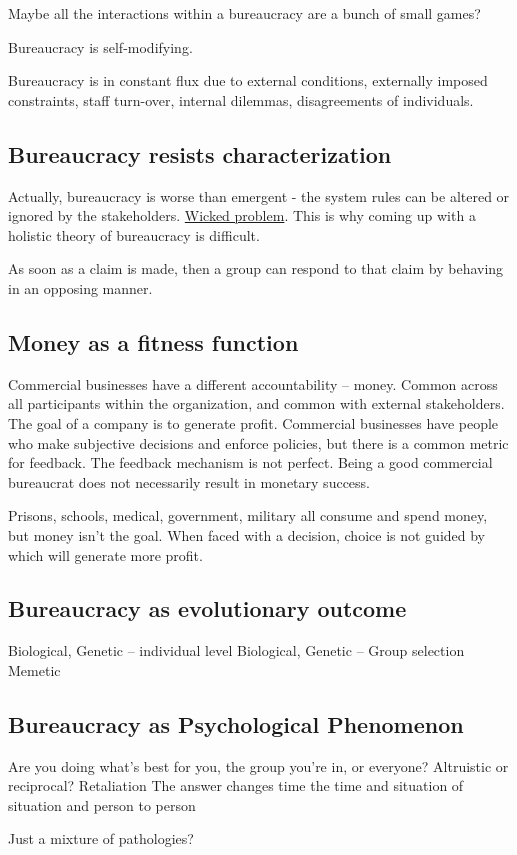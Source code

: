Maybe all the interactions within a bureaucracy are a bunch of small games?

Bureaucracy is self-modifying. 

Bureaucracy is in constant flux due to external conditions, externally imposed constraints, staff turn-over, internal dilemmas, disagreements of individuals. 


\subsection{Bureaucracy resists characterization}
Actually, bureaucracy is worse than emergent - the system rules can be altered or ignored by the stakeholders. \href{https://en.wikipedia.org/wiki/Wicked_problem}{Wicked problem}. This is why coming up with a holistic theory of bureaucracy is difficult. 

As soon as a claim is made, then a group can respond to that claim by behaving in an opposing manner. 

\subsection{Money as a fitness function}
Commercial businesses have a different accountability -- money. Common across all participants within the organization, and common with external stakeholders. The goal of a company is to generate profit. Commercial businesses have people who make subjective decisions and enforce policies, but there is a common metric for feedback. The feedback mechanism is not perfect. Being a good commercial bureaucrat does not necessarily result in monetary success.

Prisons, schools, medical, government, military all consume and spend money, but money isn't the goal. When faced with a decision, choice is not guided by which will generate more profit. 


\subsection{Bureaucracy as evolutionary outcome}

Biological, Genetic -- individual level
Biological, Genetic -- Group selection
Memetic

\subsection{Bureaucracy as Psychological Phenomenon}

Are you doing what's best for you, the group you're in, or everyone?
Altruistic or reciprocal? Retaliation
The answer changes time the time and situation of situation and person to person

Just a mixture of pathologies?